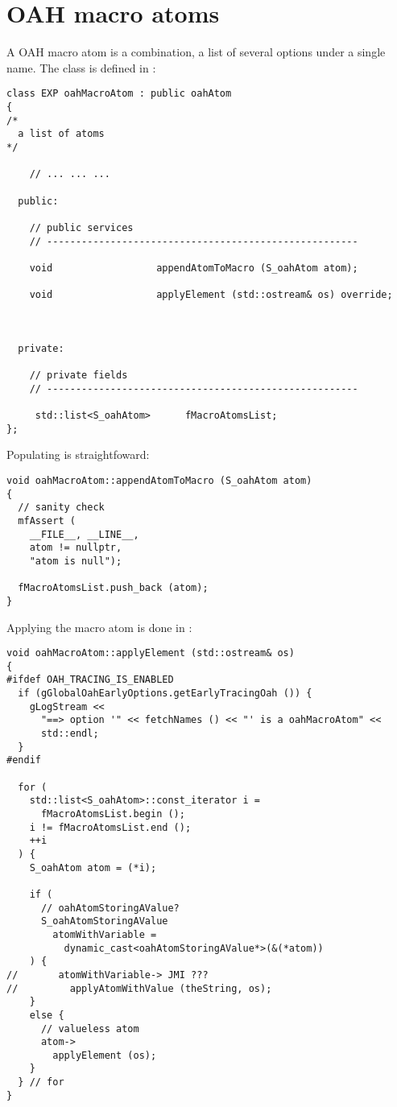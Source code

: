 \section{OAH macro atoms}

A OAH macro atom is a combination, a list of several options under a single name. The  class   is defined in :
\begin{lstlisting}[language=CPlusPlus]
class EXP oahMacroAtom : public oahAtom
{
/*
  a list of atoms
*/

	// ... ... ...

  public:

    // public services
    // ------------------------------------------------------

    void                  appendAtomToMacro (S_oahAtom atom);

    void                  applyElement (std::ostream& os) override;



  private:

    // private fields
    // ------------------------------------------------------

     std::list<S_oahAtom>      fMacroAtomsList;
};
\end{lstlisting}

Populating  is straightfoward:
\begin{lstlisting}[language=CPlusPlus]
void oahMacroAtom::appendAtomToMacro (S_oahAtom atom)
{
  // sanity check
  mfAssert (
    __FILE__, __LINE__,
    atom != nullptr,
    "atom is null");

  fMacroAtomsList.push_back (atom);
}
\end{lstlisting}

Applying the macro atom is done in :
\begin{lstlisting}[language=CPlusPlus]
void oahMacroAtom::applyElement (std::ostream& os)
{
#ifdef OAH_TRACING_IS_ENABLED
  if (gGlobalOahEarlyOptions.getEarlyTracingOah ()) {
    gLogStream <<
      "==> option '" << fetchNames () << "' is a oahMacroAtom" <<
      std::endl;
  }
#endif

  for (
    std::list<S_oahAtom>::const_iterator i =
      fMacroAtomsList.begin ();
    i != fMacroAtomsList.end ();
    ++i
  ) {
    S_oahAtom atom = (*i);

    if (
      // oahAtomStoringAValue?
      S_oahAtomStoringAValue
        atomWithVariable =
          dynamic_cast<oahAtomStoringAValue*>(&(*atom))
    ) {
//       atomWithVariable-> JMI ???
//         applyAtomWithValue (theString, os);
    }
    else {
      // valueless atom
      atom->
        applyElement (os);
    }
  } // for
}
\end{lstlisting}


